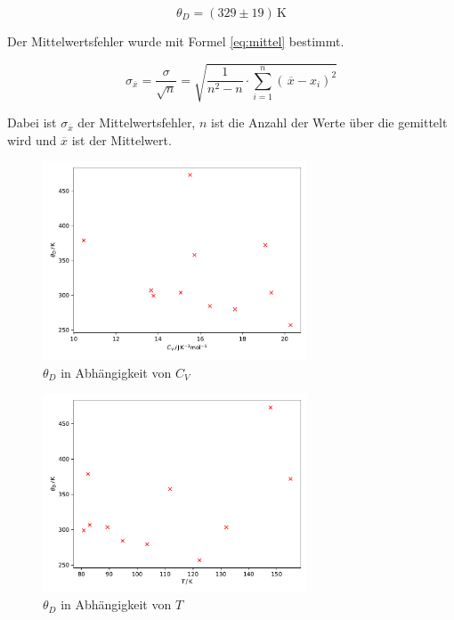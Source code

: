 \begin{equation*}
    \theta_D = (329 \pm 19) \, \mathrm{K}
    \label{eq:debye}
\end{equation*}

Der Mittelwertsfehler wurde mit Formel \eqref{eq:mittel} bestimmt.

\begin{equation}
    \sigma_{\overline{x}} = \frac{\sigma}{\sqrt{n}} = \sqrt{\frac{1}{n^2 - n} \cdot \sum\limits_{i=1}^{n} \left( \, \overline{x} - x_i \right)^2}
    \label{eq:mittel}
\end{equation}

Dabei ist $\sigma_{\overline{x}}$ der Mittelwertsfehler, $n$ ist die Anzahl der Werte über die gemittelt wird und $\overline{x}$ ist der Mittelwert.

\begin{figure}[H]
    \centering
    \includegraphics[width=0.7\textwidth]{build/Theta_C_V.pdf}
    \caption{$\theta_D$ in Abhängigkeit von $C_V$}
    \label{fig:Theta_C_V}
\end{figure}

\begin{figure}[H]
    \centering
    \includegraphics[width=0.7\textwidth]{build/Theta_T.pdf}
    \caption{$\theta_D$ in Abhängigkeit von $T$}
    \label{fig:Theta_T}
\end{figure}

